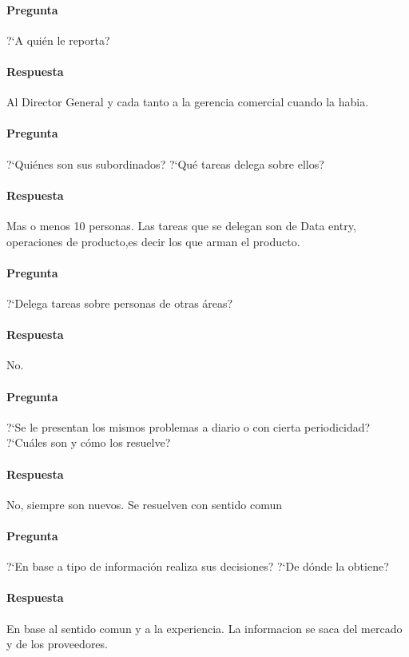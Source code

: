 \documentclass[12pt,a4paper,spanish]{article}
\begin{document}
	\paragraph{Pregunta}
	 ?`A qui\'en le reporta?
	\paragraph{Respuesta}
Al Director General y cada tanto a la gerencia comercial cuando la habia.

	\paragraph{Pregunta}
	 ?`Qui\'enes son sus subordinados?  ?`Qu\'e tareas delega sobre ellos?
	\paragraph{Respuesta}
Mas o menos 10 personas. Las tareas que se delegan son de Data entry, operaciones de producto,es decir los que arman el producto.

	\paragraph{Pregunta}
	 ?`Delega tareas sobre personas de otras \'areas?
	\paragraph{Respuesta}
No.
	\paragraph{Pregunta}
	 ?`Se le presentan los mismos problemas a diario o con cierta periodicidad?  ?`Cu\'ales son y c\'omo los resuelve?
	\paragraph{Respuesta}
No, siempre son nuevos. Se resuelven con sentido comun

	\paragraph{Pregunta}
	 ?`En base a tipo de informaci\'on realiza sus decisiones?  ?`De d\'onde la obtiene?
	\paragraph{Respuesta}
	En base al sentido comun y a la experiencia. La informacion se saca del mercado y de los proveedores.
\end{document}
